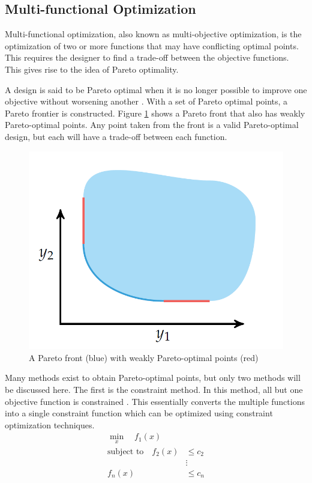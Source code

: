 \subsection*{Multi-functional Optimization}
Multi-functional optimization, also known as multi-objective optimization, is the optimization of two or more functions that may have conflicting optimal points. This requires the designer to find a trade-off between the objective functions. This gives rise to the idea of Pareto optimality.

A design is said to be Pareto optimal when it is no longer possible to improve one objective without worsening another \cite{Kochenderfer_Wheeler_2019}. With a set of Pareto optimal points, a Pareto frontier is constructed. Figure \ref{fig:pareto_front} shows a Pareto front that also has weakly Pareto-optimal points. Any point taken from the front is a valid Pareto-optimal design, but each will have a trade-off between each function.
\begin{figure}[ht]
	\centering
	\includegraphics[width=0.65\linewidth]{figures/chapter_2/ParetoFront.png}
	\caption{A Pareto front (blue) with weakly Pareto-optimal points (red) \cite{Kochenderfer_Wheeler_2019}}
	\label{fig:pareto_front}
\end{figure}

Many methods exist to obtain Pareto-optimal points, but only two methods will be discussed here. The first is the constraint method. In this method, all but one objective function is constrained \cite{Kochenderfer_Wheeler_2019}. This essentially converts the multiple functions into a single constraint function which can be optimized using constraint optimization techniques.
\begin{equation}
	\begin{split}
		\min_x \quad f_1(x) \\
		\text{subject to} \quad f_2(x) & \leq c_2 \\
		& \vdots \\
		f_n(x) &\leq c_n
	\end{split}
\end{equation}

